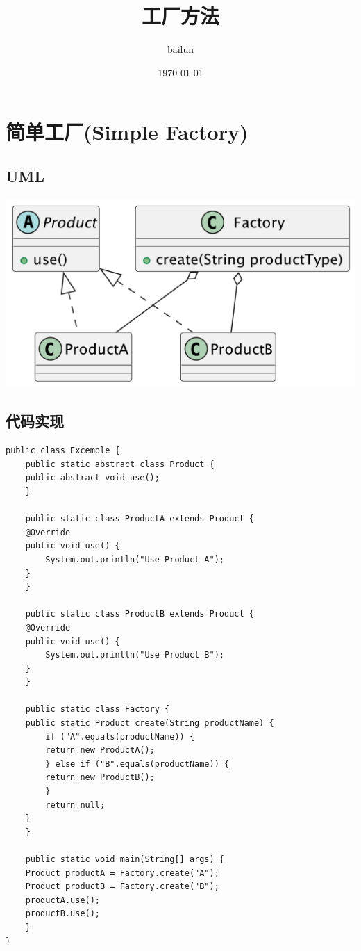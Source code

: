 \documentclass[11pt]{article}
\author{bailun}
\date{\today}
\title{工厂方法}
\begin{document}
\maketitle
\tableofcontents


\section{简单工厂(Simple Factory)}
\label{sec:orgc9c0e8e}

\subsection{UML}
\label{sec:orgc036f9c}
\begin{center}
\includegraphics[width=.9\linewidth]{imgs/simple_factory.png}
\end{center}

\subsection{代码实现}
\label{sec:orgae2986c}

\begin{verbatim}
public class Excemple {
    public static abstract class Product {
	public abstract void use();
    }

    public static class ProductA extends Product {
	@Override
	public void use() {
	    System.out.println("Use Product A");
	}
    }

    public static class ProductB extends Product {
	@Override
	public void use() {
	    System.out.println("Use Product B");
	}
    }

    public static class Factory {
	public static Product create(String productName) {
	    if ("A".equals(productName)) {
		return new ProductA();
	    } else if ("B".equals(productName)) {
		return new ProductB();
	    }
	    return null;
	}
    }

    public static void main(String[] args) {
	Product productA = Factory.create("A");
	Product productB = Factory.create("B");
	productA.use();
	productB.use();
    }
}
\end{verbatim}
\end{document}
